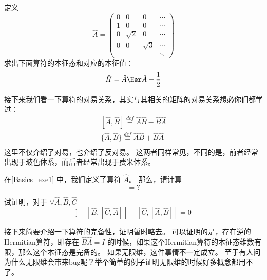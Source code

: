 \begin{exercise}{}\label{Basics_exe1}
定义
\begin{equation}
\hat{A} = \left(
\begin{matrix}
0 & 0 & 0 & \cdots \\
1 & 0 & 0 & \cdots \\
0 & \sqrt{2} & 0 & \cdots\\
0 & 0 & \sqrt{3} & \cdots\\
  &  &  &  \ddots
\end{matrix}
\right)
\end{equation}
求出下面算符的本征态和对应的本征值：
\begin{equation}
\hat{H} = \hat{A}\Her\hat{A} + \frac{1}{2}
\end{equation}
\end{exercise}

接下来我们看一下算符的对易关系，其实与其相关的矩阵的对易关系想必你们都学过：
\begin{equation}
\begin{split}
[\hat{A},\hat{B}] \overset{def}{\equiv}\hat{A}\hat{B} - \hat{B}\hat{A}\\
\{\hat{A},\hat{B}\} \overset{def}{\equiv}\hat{A}\hat{B} + \hat{B}\hat{A}\\
\end{split}
\end{equation}
这里不仅介绍了对易，也介绍了反对易。 这两者同样常见，不同的是，前者经常出现于玻色体系，而后者经常出现于费米体系。

\begin{exercise}{}
在\autoref{Basics_exe1} 中，我们定义了算符 $\hat{A}$。 那么，请计算
\begin{equation}
[\hat{A},\hat{A}\Her] = ?
\end{equation}
\end{exercise}

\begin{exercise}{}
试证明，对于 $\forall \hat{A}, \hat{B}, \hat{C}$
\begin{equation}
[\hat{A},[\hat{B},\hat{C}]] + [\hat{B},[\hat{C},\hat{A}]] + [\hat{C},[\hat{A},\hat{B}]] = 0
\end{equation}
\end{exercise}

接下来简要介绍一下算符的完备性，证明暂时略去。 可以证明的是，存在逆的Hermitian算符，即存在 $\hat{B}\hat{A} = I$ 的时候，如果这个Hermitian算符的本征态维数有限，那么这个本征态是完备的。 如果无限维，这件事情不一定成立。 至于有人问为什么无限维会带来bug呢？举个简单的例子证明无限维的时候好多概念都用不了。


